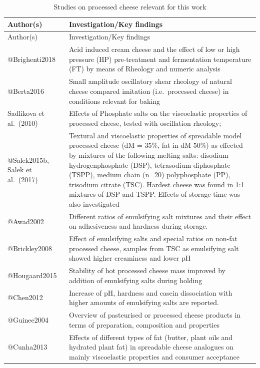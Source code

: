 \documentclass[
]{article}
\begin{document}
\begin{longtable}[]{@{}
  >{\raggedright\arraybackslash}p{}
  >{\raggedright\arraybackslash}p{}@{}}
\caption{Studies on processed cheese relevant for this
work}\tabularnewline
\toprule
Author(s) & Investigation/Key findings \\
\midrule
\endfirsthead
\toprule
Author(s) & Investigation/Key findings \\
\midrule
\endhead
@Brighenti2018 & Acid induced cream cheese and the effect of low or high
pressure (HP) pre-treatment and fermentation temperature (FT) by means
of Rheology and numeric analysis \\
@Berta2016 & Small amplitude oscillatory shear rheology of natural
cheese compared imitation (i.e.~processed cheese) in conditions relevant
for baking \\
Sadlikova et al.~(2010) & Effects of Phosphate salts on the viscoelastic
properties of processed cheese, tested with oscillation rheology; \\
@Salek2015b, Salek et al.~(2017) & Textural and viscoelastic properties
of spreadable model processed cheese (dM = 35\%, fat in dM 50\%) as
effected by mixtures of the following melting salts: disodium
hydrogenphosphate (DSP), tetrasodium diphosphate (TSPP), medium chain
(n=20) polyphosphate (PP), trisodium citrate (TSC). Hardest cheese was
found in 1:1 mixtures of DSP and TSPP. Effects of storage time was also
investigated \\
@Awad2002 & Different ratios of emulsifying salt mixtures and their
effect on adhesiveness and hardness during storage. \\
@Brickley2008 & Effect of emulsifying salts and special ratios on
non-fat processed cheese, samples from TSC as emulsifying salt showed
higher creaminess and lower pH \\
@Hougaard2015 & Stability of hot processed cheese mass improved by
addition of emulsifying salts during holding \\
@Chen2012 & Increase of pH, hardness and casein dissociation with higher
amounts of emulsifying salts are reported. \\
@Guinee2004 & Overview of pasteurised or processed cheese products in
terms of preparation, composition and properties \\
@Cunha2013 & Effects of different types of fat (butter, plant oils and
hydrated plant fat) in spreadable cheese analogues on mainly
viscoelastic properties and consumer acceptance \\

\end{longtable}
\end{document}
